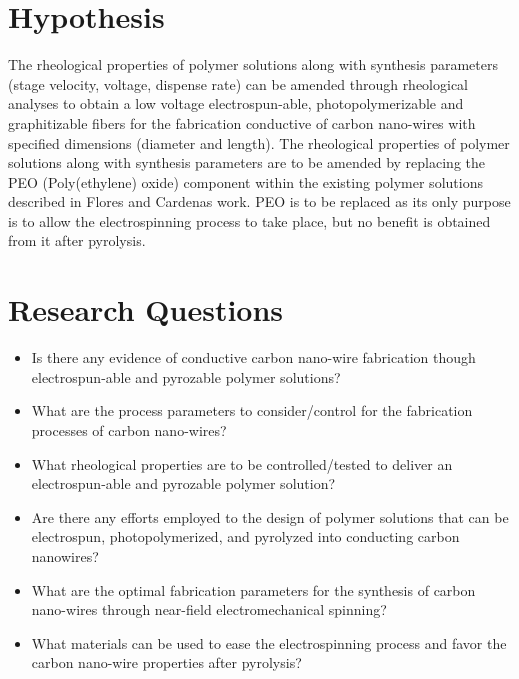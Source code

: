 \section{Hypothesis}

The rheological properties of polymer solutions along with synthesis parameters (stage velocity, voltage, dispense rate) can be amended through rheological analyses to obtain a low voltage electrospun-able, photopolymerizable and graphitizable fibers for the fabrication conductive of carbon nano-wires with specified dimensions (diameter and length). The rheological properties of polymer solutions along with synthesis parameters are to be amended by replacing the PEO (Poly(ethylene) oxide) component within the existing polymer solutions described in Flores \cite{Flores2017} and Cardenas \cite{Cardenas2017} work. PEO is to be replaced as its only purpose is to allow the electrospinning process to take place, but no benefit is obtained from it after pyrolysis.

\section{Research Questions}

\begin{itemize}
	\item{
	Is there any evidence of conductive carbon nano-wire fabrication though electrospun-able and pyrozable polymer solutions?
	}
	\item{
	What are the process parameters to consider/control for the fabrication processes of carbon nano-wires? 
	}
	\item{
	What rheological properties are to be controlled/tested to deliver an electrospun-able and pyrozable polymer solution?	
	}
	\item{
	Are there any efforts employed to the design of polymer solutions that can be electrospun, photopolymerized, and pyrolyzed into conducting carbon nanowires?
	}
	\item{
	What are the optimal fabrication parameters for the synthesis of carbon nano-wires through near-field electromechanical spinning?	
	}
	\item{
	What materials can be used to ease the electrospinning process and favor the carbon nano-wire properties after pyrolysis? 
	}
\end{itemize}

